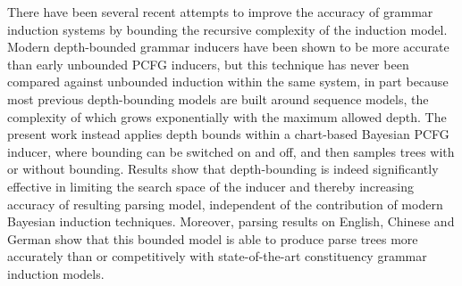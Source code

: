 There have been several recent attempts to improve the accuracy of grammar induction systems by bounding the recursive complexity of the induction model. Modern depth-bounded grammar inducers have been shown to be more accurate than early unbounded PCFG inducers, but this technique has never been compared against unbounded induction within the same system, in part because most previous depth-bounding models are built around sequence models, the complexity of which grows exponentially with the maximum allowed depth. The present work instead applies depth bounds within a chart-based Bayesian PCFG inducer, where bounding can be switched on and off, and then samples trees with or without bounding. Results show that depth-bounding is indeed significantly effective in limiting the search space of the inducer and thereby increasing accuracy of resulting parsing model, independent of the contribution of modern Bayesian induction techniques. Moreover, parsing results on English, Chinese and German show that this bounded model is able to produce parse trees more accurately than or competitively with state-of-the-art constituency grammar induction models.
